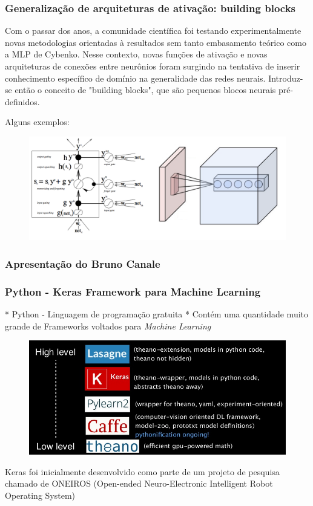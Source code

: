 \documentclass[tikz,10pt]{beamer}
\begin{document}
\begin{frame}
	\frametitle{Generalização de arquiteturas de ativação: building blocks}
	
Com o passar dos anos, a comunidade científica foi testando experimentalmente novas metodologias orientadas à     resultados sem tanto embasamento teórico como a MLP de Cybenko. Nesse contexto, novas funções de ativação e       novas arquiteturas de conexões entre neurônios foram surgindo na tentativa de inserir conhecimento específico     de domínio na generalidade das redes neurais. Introduz-se então o conceito de "building blocks", que são pequenos blocos neurais pré-definidos.

Alguns exemplos:

	 \begin{figure}
	\centering
	\includegraphics[scale=0.3]{blocks.png}
	\end{figure}
	
	
\end{frame}

\begin{frame}
	\frametitle{Apresentação do Bruno Canale}
\end{frame}

\begin{frame}
	\frametitle{Python - Keras Framework para Machine Learning}
	
	* Python - Linguagem de programação gratuita \newline
	* Contém uma quantidade muito grande de Frameworks voltados para
	\textit{Machine Learning}
	
	
	\begin{figure}
		\centering
		\includegraphics[scale=0.3]{road_map}
	\end{figure}
	
	Keras foi inicialmente desenvolvido como parte de um projeto de
	pesquisa chamado de ONEIROS (Open-ended Neuro-Electronic
	Intelligent Robot Operating System)
	
\end{frame}
\end{document}
